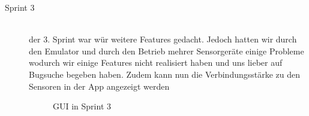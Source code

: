 \begin{description}
	\newpage
	\item [Sprint 3] \hfill \\
		der 3. Sprint war wür weitere Features gedacht. 
		Jedoch hatten wir durch den Emulator und durch den Betrieb mehrer Sensorgeräte einige Probleme wodurch wir einige Features nicht realisiert haben und uns lieber auf Bugsuche begeben haben. Zudem kann nun die Verbindungsstärke zu den Sensoren in der App angezeigt werden
		
		\begin{figure}[H]
			\centering
			\hfill
			\caption{GUI in Sprint 3}
		\end{figure}
		

\end{description}
